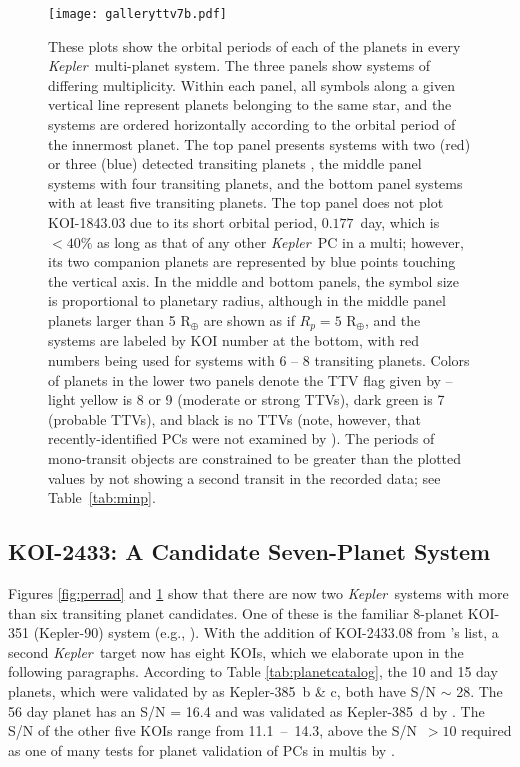 \documentclass{aastex62}
\newcommand{\ik}{{\it Kepler~}}
\begin{document}
\begin{figure}[!hbt]
\texttt{[image: galleryttv7b.pdf]}
\caption{ These plots show the orbital periods of each of the planets in every \ik multi-planet system.  The three panels show systems of differing multiplicity. Within each panel, all symbols along a given vertical line represent planets belonging to the same star, and the systems are ordered horizontally according to the  orbital period of the innermost planet.  The top panel presents systems with two (red) or three (blue) detected transiting planets%
, the middle panel systems with four transiting planets, and the bottom panel systems with at least five transiting planets. The top panel does not plot KOI-1843.03 due to its short orbital period, $0.177$~day, which is $<40\%$ as long as that of any other \ik PC in a multi; however, its two companion planets are represented by blue points touching the vertical axis. In the middle and bottom panels, the symbol size is proportional to planetary radius, although in the middle panel planets larger than 5 R$_\oplus$ are shown as if $R_p = 5$ R$_\oplus$, and the systems are labeled by KOI number at the bottom, with red numbers being used for systems with %
6 -- 8 transiting planets. Colors of planets in the lower two panels denote the TTV flag given by \cite{Kane:2019} -- light yellow is 8 or 9 (moderate or strong TTVs), dark green is 7 (probable TTVs), and black is no TTVs (note, however, that recently-identified PCs were not examined by \citealt{Kane:2019}). The periods of mono-transit objects are constrained to be greater than the plotted values by not showing a second transit in the recorded data; see Table~\ref{tab:minp}. %
}
\label{fig:gallery} 
\end{figure}


\subsection{KOI-2433: A Candidate Seven-Planet System}\label{sec:2433}

Figures \ref{fig:perrad} and \ref{fig:gallery} show that there are now two \ik systems with more than six transiting planet candidates. One of these is the familiar 8-planet KOI-351 (Kepler-90) system (e.g., \citealt{Lissauer:2014, Shallue:2018}). With the addition of KOI-2433.08 from \cite{Shallue:2018}'s list, a second \ik target now has eight KOIs, which we elaborate upon in the following paragraphs. 
According to Table \ref{tab:planetcatalog}, the 10 and 15 day planets, which were validated by \cite{Rowe:2014} as Kepler-385~b \& c, both have S/N $\sim$ 28. The 56 day planet has an S/N = 16.4 and was validated as Kepler-385~d by \cite{Armstrong:2021}. The S/N of the other five KOIs range from 11.1~--~14.3, above the S/N~$> 10$ required as one of many tests for planet validation of PCs in multis by \cite{Rowe:2014}. 
 
\end{document}
